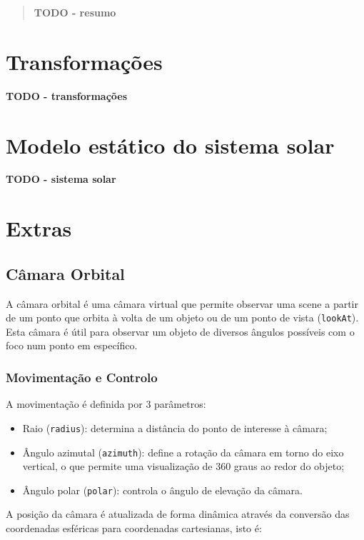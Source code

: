 \documentclass[12pt, a4paper]{article}
\begin{document}
\pagebreak

\begin{abstract}
    \textbf{\color{red} TODO - resumo}
\end{abstract}

\section{Transformações}

\textbf{\color{red} TODO - transformações}

\section{Modelo estático do sistema solar}

\textbf{\color{red} TODO - sistema solar}

\section{Extras}

\subsection{Câmara Orbital}

A câmara orbital é uma câmara virtual que permite observar uma scene a partir de um ponto que
orbita à volta de um objeto ou de um ponto de vista (\texttt{lookAt}). Esta câmara é útil para
observar um objeto de diversos ângulos possíveis com o foco num ponto em específico.

\subsubsection{Movimentação e Controlo}

A movimentação é definida por 3 parâmetros:
\begin{itemize}
    \item Raio (\texttt{radius}): determina a distância do ponto de interesse à câmara;
    \item Ângulo azimutal (\texttt{azimuth}): define a rotação da câmara em torno do eixo vertical,
    o que permite uma visualização de 360 graus ao redor do objeto;
    \item Ângulo polar (\texttt{polar}): controla o ângulo de elevação da câmara.
\end{itemize}

A posição da câmara é atualizada de forma dinâmica através da conversão das coordenadas esféricas
para coordenadas cartesianas, isto é:
\end{document}
